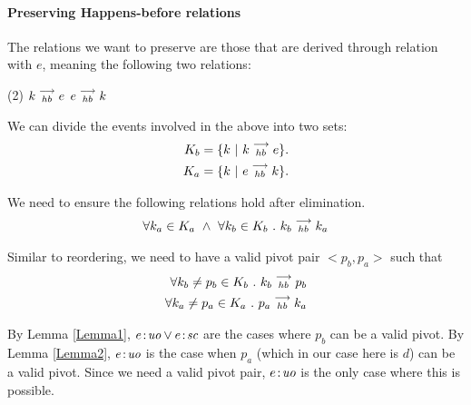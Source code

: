 \paragraph{Preserving Happens-before relations}
        
    The relations we want to preserve are those that are derived through relation with $e$, meaning the following two relations:
    \begin{tasks}(2)
        \task $k\stackrel{\longrightarrow}{_{hb}}e$
        \task $e\stackrel{\longrightarrow}{_{hb}}k$
    \end{tasks}

    We can divide the events involved in the above into two sets:
    \begin{align*}
        K_b = \{k \ | \ k\stackrel{\longrightarrow}{_{hb}}e \}. \\
        K_a = \{k \ | \ e\stackrel{\longrightarrow}{_{hb}}k \}. 
    \end{align*}

    
    We need to ensure the following relations hold after elimination.
    \begin{align}
        \forall k_a \in K_a \ \wedge \ \forall k_b \in K_b \ . \ \reln{k_b}{hb}{k_a}
    \end{align}
    
    Similar to reordering, we need to have a valid pivot pair $<p_b, p_a>$ such that 
    \begin{align}
        \forall k_b \neq p_b \in K_b \ . \ k_b\stackrel{\longrightarrow}{_{hb}}p_b \\
        \forall k_a \neq p_a \in K_a \ . \ p_a\stackrel{\longrightarrow}{_{hb}}k_a 
    \end{align}

    By Lemma \ref{Lemma1}, $e\!:\!\textit{uo} \vee e\!:\!\textit{sc}$ are the cases where $p_b$ can be a valid pivot. 
    By Lemma \ref{Lemma2}, $e\!:\!\textit{uo}$ is the case when $p_a$ (which in our case here is $d$) can be a valid pivot. 
    Since we need a valid pivot pair, $e\!:\!\textit{uo}$ is the only case where this is possible. 

